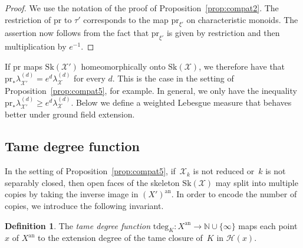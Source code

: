 \documentclass[JEP,XML,SOM,Unicode,NoFloatCountersInSection]{cedram}
\theoremstyle{definition}
\newtheorem{definition}[equation]{Definition}
\numberwithin{equation}{subsection}
\newcommand{\N}{\ensuremath{\mathbb{N}}}
\newcommand{\cX}{\ensuremath{\mathscr{X}}}
\newcommand{\an}{\mathrm{an}}
\newcommand{\pr}{\mathrm{pr}}
\newcommand{\Sk}{\mathrm{Sk}}
\newcommand{\tdeg}{\mathrm{tdeg}}
\let\Leb\lambda
\begin{document}
\begin{proof} We use the notation of the proof of Proposition~\ref{prop:compat2}. The restriction of $\pr$ to $\tau'$ corresponds to the map $\pr_{\xi'}$ on characteristic monoids. The assertion now follows from the fact that $\pr_{\xi'}$ is given by restriction and then multiplication by $e^{-1}$.
\end{proof}
If $\pr$ maps $\Sk(\cX')$ homeomorphically onto $\Sk(\cX)$, we therefore have
that $\pr_*\Leb^{(d)}_{\cX'}=e^d\Leb^{(d)}_\cX$ for every $d$. This is the case
in the setting of Proposition~\ref{prop:compat5}, for example.
In general, we only have the inequality $\pr_*\Leb^{(d)}_{\cX'}\ge e^d\Leb^{(d)}_\cX$. Below we define a weighted Lebesgue measure that behaves better under ground field extension.

\subsection{Tame degree function}\label{ss:tamedeg}
In the setting of Proposition~\ref{prop:compat5}, if~$\cX_k$ is not reduced or~$k$ is not separably closed, then open faces of the skeleton $\Sk(\cX)$ may split into multiple copies by taking the inverse image
in $(X')^{\an}$. In order to encode the number of copies, we introduce the following invariant.
\begin{definition}
The \emph{tame degree function} $\tdeg_K\colon X^{\an}\to \N\cup \{\infty\}$ maps each point~$x$ of $X^{\an}$ to the extension degree of the tame closure of~$K$ in $\mathscr{H}(x)$.
\end{definition}
\end{document}
